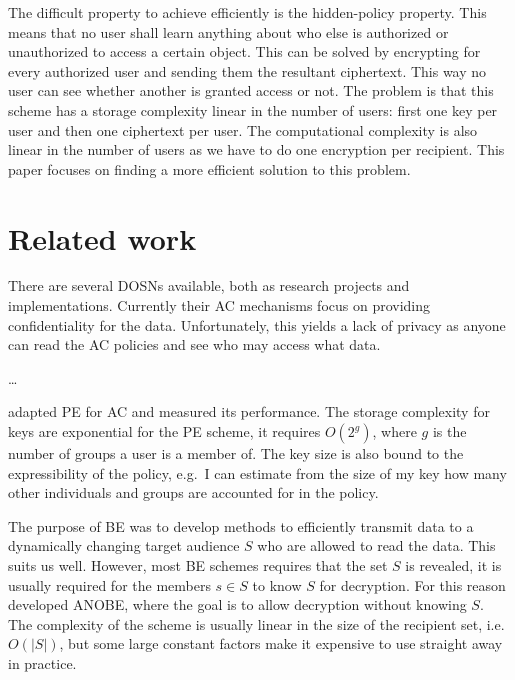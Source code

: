 The difficult property to achieve efficiently is the hidden-policy property.
This means that no user shall learn anything about who else is authorized or 
unauthorized to access a certain object.
This can be solved by encrypting for every authorized user and sending them the 
resultant ciphertext.
This way no user can see whether another is granted access or not.
The problem is that this scheme has a storage complexity linear in the number 
of users: first one key per user and then one ciphertext per user.
The computational complexity is also linear in the number of users as we have 
to do one encryption per recipient.
This paper focuses on finding a more efficient solution to this problem.


\section{Related work}

There are several \acp{DOSN} available, both as research projects and 
implementations.
Currently their \ac{AC} mechanisms focus on providing confidentiality for the 
data.
Unfortunately, this yields a lack of privacy as anyone can read the \ac{AC} 
policies and see who may access what data.

\dots

\citet{predicateac} adapted \ac{PE} for \ac{AC} and measured its performance.
The storage complexity for keys are exponential for the \ac{PE} scheme, it 
requires \(O(2^g)\), where \(g\) is the number of groups a user is a member of.
The key size is also bound to the expressibility of the policy, e.g.~I can 
estimate from the size of my key how many other individuals and groups are 
accounted for in the policy.

The purpose of \ac{BE} \cite{broadcastenc} was to develop methods to 
efficiently transmit data to a dynamically changing target audience \(S\) who 
are allowed to read the data.
This suits us well.
However, most \ac{BE} schemes requires that the set \(S\) is revealed, it is 
usually required for the members \(s\in S\) to know \(S\) for decryption.
For this reason \citet{anobe} developed \ac{ANOBE}, where the goal is to allow 
decryption without knowing \(S\).
The complexity of the scheme is usually linear in the size of the recipient 
set, i.e.~\(O(|S|)\), but some large constant factors make it expensive to use 
straight away in practice.

